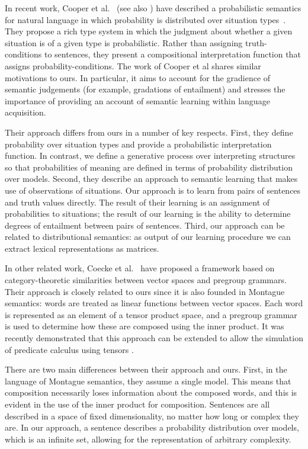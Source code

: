 \documentclass[11pt]{article}
\theoremstyle{definition}
\begin{document}

In recent work, Cooper et al.~\cite{Cooper:14} (see also
\cite{Eijck:12}) have described a probabilistic semantics for natural language in which probability is distributed over situation types~\cite{Barwise:83}. They propose a rich type system in which the judgment about whether a given situation is of a given type is probabilistic. Rather than assigning truth-conditions to sentences, they present a compositional interpretation function that assigns probability-conditions. The work of Cooper et al shares similar motivations to ours. In particular, it aims to account for the gradience of semantic judgements (for example, gradations of entailment) and stresses the importance of providing an account of semantic learning within language acquisition.

Their approach differs from ours in a number of key respects. First, they define probability over situation types and provide a probabilistic interpretation function. In contrast, we define a generative process over interpreting structures so that probabilities of meaning are defined in terms of probability distribution over models. Second, they describe an approach to semantic learning that makes use of observations of situations. Our approach is to learn from pairs of sentences and truth values directly. The result of their learning is an assignment of probabilities to situations; the result of our learning is the ability to determine degrees of entailment between pairs of sentences. Third, our approach can be related to distributional semantics: as output of our learning procedure we can extract lexical representations as matrices.

In other related work, Coecke et al.~\cite{Coecke:10} have proposed a framework based on category-theoretic
similarities between vector spaces and pregroup grammars. Their
approach is closely related to ours since it is also
founded in Montague semantics: words are treated as linear functions
between vector spaces. Each word is represented as an element of a
tensor product space, and a pregroup grammar is used to determine how
these are composed using the inner product. It was recently
demonstrated that this approach can be extended to allow the
simulation of predicate calculus using
tensors \cite{Grefenstette:13}.

There are two main differences between their approach and ours. First,
in the language of Montague semantics, they assume a single
model. This means that composition necessarily loses information about
the composed words, and this is evident in the use of the inner
product for composition. Sentences are all described in a space of
fixed dimensionality, no matter how long or complex they are. In our
approach, a sentence describes a probability distribution over models,
which is an infinite set, allowing for the representation of arbitrary
complexity.
\end{document}

